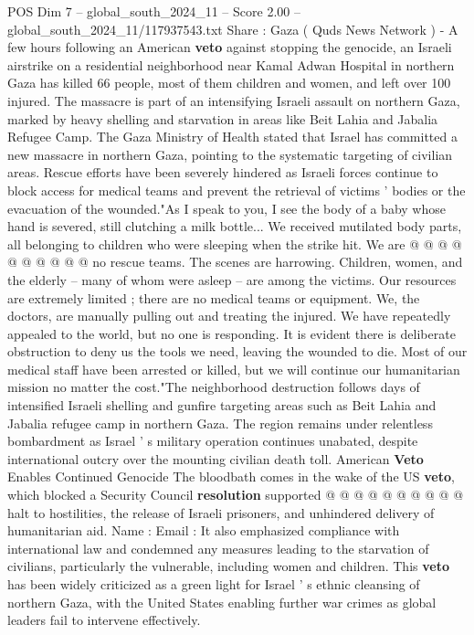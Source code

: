 \begin{textsample}{POS Dim 7 – global\_south\_2024\_11 – Score 2.00 – global\_south\_2024\_11/117937543.txt}  \label{ex:f7_pos_015}
Share : Gaza ( Quds News Network ) - A few hours following an American \textbf{veto} against stopping the genocide, an Israeli airstrike on a residential neighborhood near Kamal Adwan Hospital in northern Gaza has killed 66 people, most of them children and women, and left over 100 injured.
The massacre is part of an intensifying Israeli assault on northern Gaza, marked by heavy shelling and starvation in areas like Beit Lahia and Jabalia Refugee Camp.
The Gaza Ministry of Health stated that Israel has committed a new massacre in northern Gaza, pointing to the systematic targeting of civilian areas.
Rescue efforts have been severely hindered as Israeli forces continue to block access for medical teams and prevent the retrieval of victims ' bodies or the evacuation of the wounded."As I speak to you, I see the body of a baby whose hand is severed, still clutching a milk bottle...
We received mutilated body parts, all belonging to children who were sleeping when the strike hit.
We are @ @ @ @ @ @ @ @ @ @ no rescue teams.
The scenes are harrowing.
Children, women, and the elderly -- many of whom were asleep -- are among the victims.
Our resources are extremely limited ; there are no medical teams or equipment.
We, the doctors, are manually pulling out and treating the injured.
We have repeatedly appealed to the world, but no one is responding.
It is evident there is deliberate obstruction to deny us the tools we need, leaving the wounded to die.
Most of our medical staff have been arrested or killed, but we will continue our humanitarian mission no matter the cost."The neighborhood destruction follows days of intensified Israeli shelling and gunfire targeting areas such as Beit Lahia and Jabalia refugee camp in northern Gaza.
The region remains under relentless bombardment as Israel ' s military operation continues unabated, despite international outcry over the mounting civilian death toll.
American \textbf{Veto} Enables Continued Genocide The bloodbath comes in the wake of the US \textbf{veto}, which blocked a Security Council \textbf{resolution} supported @ @ @ @ @ @ @ @ @ @ halt to hostilities, the release of Israeli prisoners, and unhindered delivery of humanitarian aid.
Name : Email : It also emphasized compliance with international law and condemned any measures leading to the starvation of civilians, particularly the vulnerable, including women and children.
This \textbf{veto} has been widely criticized as a green light for Israel ' s ethnic cleansing of northern Gaza, with the United States enabling further war crimes as global leaders fail to intervene effectively.

\end{textsample}
